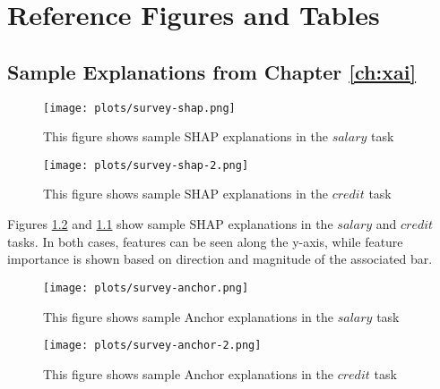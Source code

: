 

\chapter{\label{app:figures}Reference Figures and Tables}

\minitoc

\section{Sample Explanations from Chapter \ref{ch:xai}}\label{app:xaifigures}

\begin{figure}[htbp]
    \centering
    \texttt{[image: plots/survey-shap.png]}
    \caption{This figure shows sample SHAP explanations in the $salary$ task}
    \label{fig:shapsalaryfull}
\end{figure}

\begin{figure}[hbtp]
    \centering
    \texttt{[image: plots/survey-shap-2.png]}
    \caption{This figure shows sample SHAP explanations in the $credit$ task}
    \label{fig:shapcreditfull}
\end{figure}

Figures \ref{fig:shapcreditfull} and \ref{fig:shapsalaryfull} show sample SHAP explanations in the $salary$ and $credit$ tasks. In both cases, features can be seen along the y-axis, while feature importance is shown based on direction and magnitude of the associated bar.

\begin{figure}[htbp]
    \centering
    \texttt{[image: plots/survey-anchor.png]}
    \caption{This figure shows sample Anchor explanations in the $salary$ task}
    \label{fig:anchorsalaryfull}
\end{figure}

\begin{figure}[hbtp]
    \centering
    \texttt{[image: plots/survey-anchor-2.png]}
    \caption{This figure shows sample Anchor explanations in the $credit$ task}
    \label{fig:anchorcreditfull}
\end{figure}

